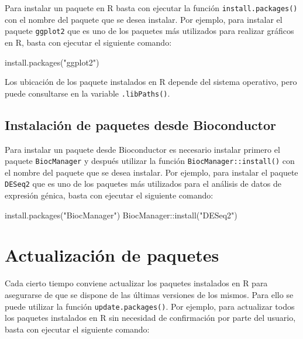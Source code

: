 \documentclass[
  spanish,
  a4paper,
]{scrreport}
\newenvironment{Shaded}{\begin{snugshade}}{\end{snugshade}}
\newcommand{\FunctionTok}[1]{\textcolor[rgb]{0.28,0.35,0.67}{#1}}
\newcommand{\NormalTok}[1]{\textcolor[rgb]{0.00,0.23,0.31}{#1}}
\newcommand{\SpecialCharTok}[1]{\textcolor[rgb]{0.37,0.37,0.37}{#1}}
\newcommand{\StringTok}[1]{\textcolor[rgb]{0.13,0.47,0.30}{#1}}
\theoremstyle{definition}
\theoremstyle{remark}
\begin{document}
Para instalar un paquete en R basta con ejecutar la función
\texttt{install.packages()} con el nombre del paquete que se desea
instalar. Por ejemplo, para instalar el paquete \texttt{ggplot2} que es
uno de los paquetes más utilizados para realizar gráficos en R, basta
con ejecutar el siguiente comando:

\begin{Shaded}
\begin{Highlighting}[]
\FunctionTok{install.packages}\NormalTok{(}\StringTok{"ggplot2"}\NormalTok{)}
\end{Highlighting}
\end{Shaded}

Los ubicación de los paquete instalados en R depende del sistema
operativo, pero puede consultarse en la variable \texttt{.libPaths()}.

\subsection{Instalación de paquetes desde
Bioconductor}\label{instalaciuxf3n-de-paquetes-desde-bioconductor}

Para instalar un paquete desde Bioconductor es necesario instalar
primero el paquete \texttt{BiocManager} y después utilizar la función
\texttt{BiocManager::install()} con el nombre del paquete que se desea
instalar. Por ejemplo, para instalar el paquete \texttt{DESeq2} que es
uno de los paquetes más utilizados para el análisis de datos de
expresión génica, basta con ejecutar el siguiente comando:

\begin{Shaded}
\begin{Highlighting}[]
\FunctionTok{install.packages}\NormalTok{(}\StringTok{"BiocManager"}\NormalTok{)}
\NormalTok{BiocManager}\SpecialCharTok{::}\FunctionTok{install}\NormalTok{(}\StringTok{"DESeq2"}\NormalTok{)}
\end{Highlighting}
\end{Shaded}

\section{Actualización de paquetes}\label{actualizaciuxf3n-de-paquetes}

Cada cierto tiempo conviene actualizar los paquetes instalados en R para
asegurarse de que se dispone de las últimas versiones de los mismos.
Para ello se puede utilizar la función \texttt{update.packages()}. Por
ejemplo, para actualizar todos los paquetes instalados en R sin
necesidad de confirmación por parte del usuario, basta con ejecutar el
siguiente comando:
\end{document}
